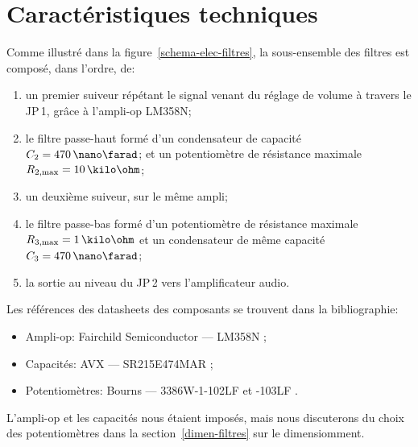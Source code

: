 \section{Caractéristiques techniques}

Comme illustré dans la figure~\ref{schema-elec-filtres},
la sous-ensemble des filtres est composé, dans l'ordre, de:
\begin{enumerate}
    \item un premier suiveur répétant le signal venant du réglage de volume
        à travers le JP\,1, grâce à l'ampli-op LM358N;
    \item le filtre passe-haut formé d'un
        condensateur de capacité $C_2 = 470\,\nano\farad$;
        et un potentiomètre de résistance
        maximale $R\ind{2,max} = 10\,\kilo\ohm$;
    \item un deuxième suiveur, sur le même ampli;
    \item le filtre passe-bas formé d'un potentiomètre de résistance
        maximale $R\ind{3,max} = 1\,\kilo\ohm$
        et un condensateur de même capacité $C_3 = 470\,\nano\farad$;
    \item la sortie au niveau du JP\,2 vers l'amplificateur audio.
\end{enumerate}

Les références des datasheets des composants se trouvent dans la bibliographie:
\begin{itemize}
    \item Ampli-op: Fairchild Semiconductor --- LM358N \cite{datasheet-lm358n};
    \item Capacités: AVX --- SR215E474MAR \cite{datasheet-470nf};
    \item Potentiomètres: Bourns --- 3386W-1-102LF et -103LF \cite{datasheet-pot}.
\end{itemize}

L'ampli-op et les capacités nous étaient imposés,
mais nous discuterons du choix des potentiomètres dans
la section~\ref{dimen-filtres} sur le dimensiomment.
